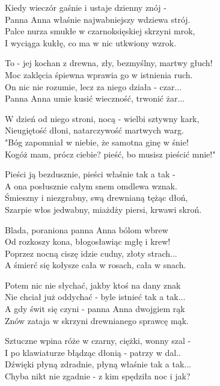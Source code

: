 \begin{text}
    \begin{smallTwo}
    Kiedy wieczór gaśnie i ustaje dzienny znój -\\
    Panna Anna właśnie najwabniejszy wdziewa strój.\\
    Palce nurza smukłe w czarnoksięskiej skrzyni mrok,\\
    I wyciąga kukłę, co ma w nic utkwiony wzrok.

    To - jej kochan z drewna, zły, bezmyślny, martwy głuch!\\
    Moc zaklęcia śpiewna wprawia go w istnienia ruch.\\
    On nic nie rozumie, lecz za niego działa - czar...\\
    Panna Anna umie kusić wieczność, trwonić żar...

    W dzień od niego stroni, nocą - wielbi sztywny kark,\\
    Nieugiętość dłoni, natarczywość martwych warg.\\
    "Bóg zapomniał w niebie, że samotna ginę w śnie!\\
    Kogóż mam, prócz ciebie? pieść, bo musisz pieścić mnie!"

    Pieści ją bezdusznie, pieści właśnie tak a tak -\\
    A ona posłusznie całym snem omdlewa wznak.\\
    Śmieszny i niezgrabny, swą drewnianą tężąc dłoń,\\
    Szarpie włos jedwabny, miażdży piersi, krwawi skroń.

    Blada, poraniona panna Anna bólom wbrew\\
    Od rozkoszy kona, błogosławiąc mgłę i krew!\\
    Poprzez nocną ciszę idzie cudny, złoty strach...\\
    A śmierć się kołysze cała w rosach, cała w snach.

    Potem nic nie słychać, jakby ktoś na dany znak\\
    Nie chciał już oddychać - byle istnieć tak a tak...\\
    A gdy świt się czyni - panna Anna dwojgiem rąk\\
    Znów zataja w skrzyni drewnianego sprawcę mąk.

    Sztuczne wpina róże w czarny, ciężki, wonny szal -\\
    I po klawiaturze błądząc dłonią - patrzy w dal..\\
    Dźwięki płyną zdradnie, płyną właśnie tak a tak...\\
    Chyba nikt nie zgadnie - z kim spędziła noc i jak?
\end{smallTwo}
\end{text}
